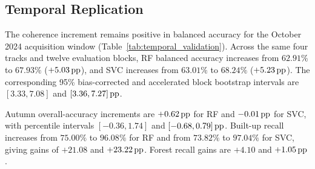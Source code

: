 \subsection{Temporal Replication}
\label{sec:temporal_validation}
The coherence increment remains positive in balanced accuracy for the October 2024 acquisition window (Table~\ref{tab:temporal_validation}). Across the same four tracks and twelve evaluation blocks, RF balanced accuracy increases from $62.91\%$ to $67.93\%$ ($+5.03\,\mathrm{pp}$), and SVC increases from $63.01\%$ to $68.24\%$ ($+5.23\,\mathrm{pp}$). The corresponding 95\% bias-corrected and accelerated block bootstrap intervals are $[3.33,7.08]$ and $[3.36,7.27]\,\mathrm{pp}$.

Autumn overall-accuracy increments are $+0.62\,\mathrm{pp}$ for RF and $-0.01\,\mathrm{pp}$ for SVC, with percentile intervals $[-0.36,1.74]$ and $[-0.68,0.79]\,\mathrm{pp}$. Built-up recall increases from $75.00\%$ to $96.08\%$ for RF and from $73.82\%$ to $97.04\%$ for SVC, giving gains of $+21.08$ and $+23.22\,\mathrm{pp}$. Forest recall gains are $+4.10$ and $+1.05\,\mathrm{pp}$.

